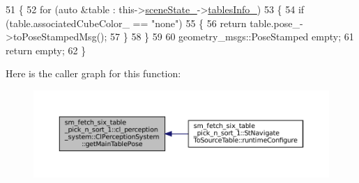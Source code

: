 \begin{DoxyCode}
51             \{
52                 \textcolor{keywordflow}{for} (\textcolor{keyword}{auto} &table : this->\hyperlink{classsm__fetch__six__table__pick__n__sort__1_1_1cl__perception__system_1_1ClPerceptionSystem_abf68c35d49ab0c766521e23f4e3b4d41}{sceneState\_}->\hyperlink{classsm__fetch__six__table__pick__n__sort__1_1_1cl__perception__system_1_1CpSceneState_a2de6a25cdfe869099984fbf8225874cd}{tablesInfo\_})
53                 \{
54                     \textcolor{keywordflow}{if} (table.associatedCubeColor\_ == \textcolor{stringliteral}{"none"})
55                     \{
56                         \textcolor{keywordflow}{return} table.pose\_->toPoseStampedMsg();
57                     \}
58                 \}
59 
60                 geometry\_msgs::PoseStamped empty;
61                 \textcolor{keywordflow}{return} empty;
62             \}
\end{DoxyCode}
Here is the caller graph for this function\+:
\nopagebreak
\begin{figure}[H]
\begin{center}
\leavevmode
\includegraphics[width=350pt]{classsm__fetch__six__table__pick__n__sort__1_1_1cl__perception__system_1_1ClPerceptionSystem_a99ee4544e986811d5c7ff9dcce552eb0_icgraph}
\end{center}
\end{figure}
\mbox{\label{classsm__fetch__six__table__pick__n__sort__1_1_1cl__perception__system_1_1ClPerceptionSystem_a4103ba8479b122c7af34b3b51102c5d5}} 
